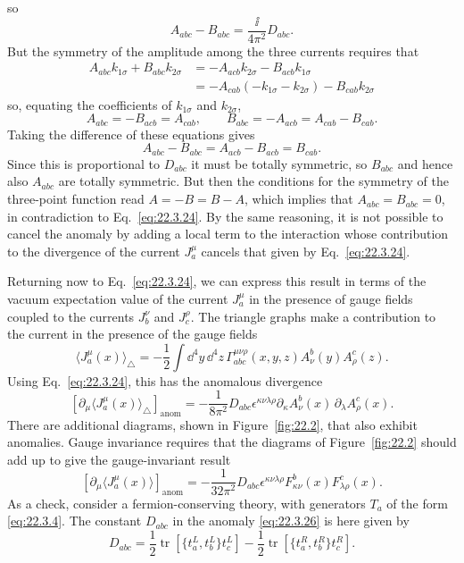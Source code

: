so
\[
 A_{abc}-B_{abc}
 =\frac{\ii}{4\pi^2}D_{abc}.
\]
But the symmetry of the amplitude among the three currents requires that
\[
 \begin{aligned}
 A_{abc}k_{1\sigma}
 +B_{abc}k_{2\sigma}
 &=-A_{acb}k_{2\sigma}
   -B_{acb}k_{1\sigma}
 \\
 &=-A_{cab}(-k_{1\sigma}-k_{2\sigma})
   -B_{cab}k_{2\sigma}
 \end{aligned}
\]
so, equating the coefficients of $k_{1\sigma}$ and $k_{2\sigma}$,
\[
 A_{abc}=-B_{acb}
 =A_{cab},
 \qquad
 B_{abc}=-A_{acb}
 =A_{cab}-B_{cab}.
\]
Taking the difference of these equations gives
\[
 A_{abc}-B_{abc}
 =A_{acb}-B_{acb}
 =B_{cab}.
\]
Since this is proportional to $D_{abc}$ it must be totally
symmetric, so $B_{abc}$ and hence also
$A_{abc}$ are totally symmetric. But then the conditions for
the symmetry of the three-point function read $A=-B=B-A$, which implies
that $A_{abc}=B_{abc}=0$, in contradiction to
Eq.~\eqref{eq:22.3.24}. By the same reasoning, it is not possible to cancel
the anomaly by adding a local term to the interaction whose contribution to
the divergence of the current $J_a^\mu$ cancels that given by
Eq.~\eqref{eq:22.3.24}.

Returning now to Eq.~\eqref{eq:22.3.24}, we can express this result in terms
of the vacuum expectation value of the current $J_a^\mu$ in the
presence of gauge fields coupled to the currents $J_b^\nu$ and
$J_c^\rho$. The triangle graphs make a contribution to the current in
the presence of the gauge fields
\begin{equation}
 \bigl\langle J_a^\mu(x)\bigr\rangle_\triangle
 =-\frac12\int \dd^4y\,\dd^4z\,
 \Gamma_{abc}^{\mu\nu\rho}(x,y,z)
 A_\nu^b(y)A_\rho^c(z).
 \tag{22.3.25}\label{eq:22.3.25}
\end{equation}
Using Eq.~\eqref{eq:22.3.24}, this has the anomalous divergence
\begin{equation}
 \left[
  \partial_\mu\bigl\langle J_a^\mu(x)\bigr\rangle_\triangle
 \right]_{\mathrm{anom}}
 =-\frac{1}{8\pi^2}D_{abc}
 \epsilon^{\kappa\nu\lambda\rho}
 \partial_\kappa A_\nu^b(x)\,
 \partial_\lambda A_\rho^c(x).
 \tag{22.3.26}\label{eq:22.3.26}
\end{equation}
There are additional diagrams, shown in Figure~\ref{fig:22.2}, that also
exhibit anomalies. Gauge invariance requires that the diagrams of
Figure~\ref{fig:22.2} should add up to give the gauge-invariant result
\begin{equation}
 \left[
  \partial_\mu\bigl\langle J_a^\mu(x)\bigr\rangle
 \right]_{\mathrm{anom}}
 =-\frac{1}{32\pi^2}D_{abc}
 \epsilon^{\kappa\nu\lambda\rho}
 F_{\kappa\nu}^b(x)F_{\lambda\rho}^c(x).
 \tag{22.3.27}\label{eq:22.3.27}
\end{equation}
As a check, consider a fermion-conserving theory, with generators
$T_a$ of the form \eqref{eq:22.3.4}. The constant
$D_{abc}$ in the anomaly \eqref{eq:22.3.26} is here given by
\begin{equation}
 D_{abc}
 =\frac12\operatorname{tr}
 \left[\{t_a^L,t_b^L\}t_c^L\right]
 -\frac12\operatorname{tr}
 \left[\{t_a^R,t_b^R\}t_c^R\right].
 \tag{22.3.28}\label{eq:22.3.28}
\end{equation}

